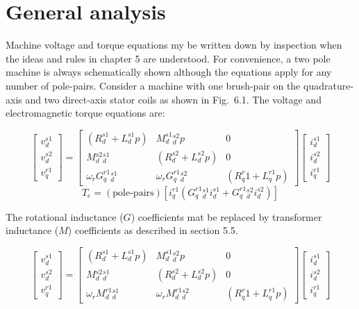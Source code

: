 \documentclass[a4paper,numbers=noenddot,12pt]{scrbook}
\begin{document}
\section{General analysis}
Machine voltage and torque equations my be written down by inspection when the ideas and rules in chapter 5 are understood. For convenience, a two pole machine is always schematically shown although the equations apply for any number of pole-pairs.
Consider a machine with one brush-pair on the quadrature-axis and two direct-axis stator coils as shown in Fig.\ 6.1. The voltage and electromagnetic torque equations are:

\begin{equation}
    \begin{bmatrix}
        v_d^{s1}\\[2ex] v_d^{s2}\\[2ex] v_q^{r1}
    \end{bmatrix} =
    \begin{bmatrix}
        (R_d^{s1} + L_d^{s1}p) & M_{d}^{s1}{}_{d}^{s2} p & 0 \\[2ex]
        M{_d^{s2}{}_d^{s1}} & (R_d^{s2} + L_d^{s2}p) & 0 \\[2ex]
        \omega_r G_{q}^{r1}{}_d^{s1} & \omega_r G_{q}^{r1}{}_d^{s2} & (R_q^r1{} + L_q^{r1}p)
    \end{bmatrix}
    \begin{bmatrix}
        i_d^{s1} \\[2ex] i_d^{s2} \\[2ex] i_q^{r1}
    \end{bmatrix}
    \label{}
\end{equation}
\begin{equation}
    T_e = (\text{pole-pairs})[i_q^{r1}(G_q^{r1}{}_d^{s1} i_d^{s1} + G_q^{r1}{}_d^{s2} i_d^{s2})]
    \label{}
\end{equation}

The rotational inductance ($G$) coefficients mat be replaced by transformer inductance ($M$) coefficients as described in section 5.5.

\begin{equation}
    \begin{bmatrix}
        v_d^{s1}\\[2ex] v_d^{s2}\\[2ex] v_q^{r1}
    \end{bmatrix} =
    \begin{bmatrix}
        (R_d^{s1} + L_d^{s1}p) & M_{d}^{s1}{}_{d}^{s2} p & 0 \\[2ex]
        M{_d^{s2}{}_d^{s1}} & (R_d^{s2} + L_d^{s2}p) & 0 \\[2ex]
        \omega_r M_{d}^{r1}{}_d^{s1} & \omega_r M_{d}^{r1}{}_d^{s2} & (R_q^r1{} + L_q^{r1}p)
    \end{bmatrix}
    \begin{bmatrix}
        i_d^{s1} \\[2ex] i_d^{s2} \\[2ex] i_q^{r1}
    \end{bmatrix}
    \label{}
\end{equation}
\end{document}
